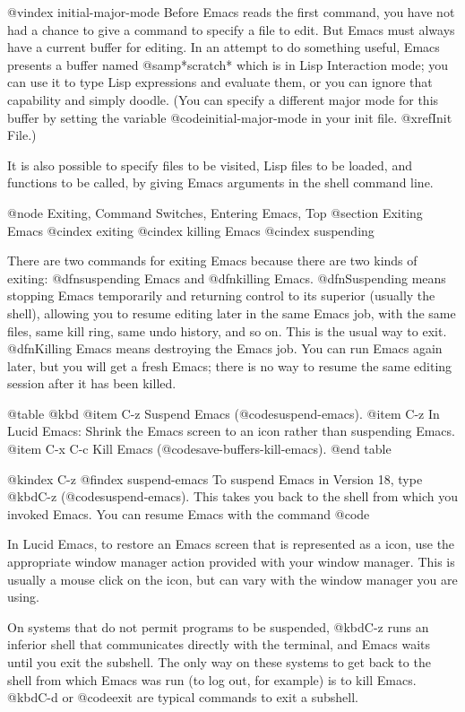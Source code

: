 {{@vindex initial-major-mode
  Before Emacs reads the first command, you have not had a chance to give a
command to specify a file to edit.  But Emacs must always have a current
buffer for editing.  In an attempt to do something useful, Emacs presents a
buffer named @samp{*scratch*} which is in Lisp Interaction mode; you can
use it to type Lisp expressions and evaluate them, or you can ignore that
capability and simply doodle.  (You can specify a different major mode for
this buffer by setting the variable @code{initial-major-mode} in your init
file.  @xref{Init File}.)

  It is also possible to specify files to be visited, Lisp files to be
loaded, and functions to be called, by giving Emacs arguments in the
shell command line.  

@node Exiting, Command Switches, Entering Emacs, Top
@section Exiting Emacs
@cindex exiting
@cindex killing Emacs
@cindex suspending

  There are two commands for exiting Emacs because there are two kinds of
exiting: @dfn{suspending} Emacs and @dfn{killing} Emacs.  @dfn{Suspending} means
stopping Emacs temporarily and returning control to its superior (usually
the shell), allowing you to resume editing later in the same Emacs job,
with the same files, same kill ring, same undo history, and so on.  This is
the usual way to exit.  @dfn{Killing} Emacs means destroying the Emacs job.
You can run Emacs again later, but you will get a fresh Emacs; there is no
way to resume the same editing session after it has been killed.

@table @kbd
@item C-z
Suspend Emacs (@code{suspend-emacs}).
@item C-z
In Lucid Emacs: Shrink the Emacs screen to an icon rather than suspending Emacs.
@item C-x C-c
Kill Emacs (@code{save-buffers-kill-emacs}).
@end table

@kindex C-z
@findex suspend-emacs
  To suspend Emacs in Version 18, type @kbd{C-z} (@code{suspend-emacs}).  This takes
you back to the shell from which you invoked Emacs.  You can resume
Emacs with the command @code{%

  In Lucid Emacs, to restore an Emacs screen that is represented as a icon, use the 
appropriate window manager action provided with your window manager.  This is 
usually a mouse click on the icon, but can vary with the window manager
you are using.    

  On systems that do not permit programs to be suspended, @kbd{C-z} runs an
inferior shell that communicates directly with the terminal, and Emacs
waits until you exit the subshell.  The only way on these systems to get
back to the shell from which Emacs was run (to log out, for example) is to
kill Emacs.  @kbd{C-d} or @code{exit} are typical commands to exit a
subshell.

}}}
